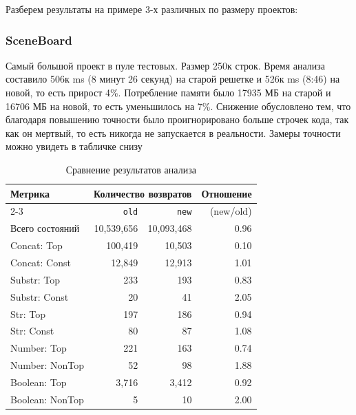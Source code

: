 Разберем результаты на примере 3-х различных по размеру проектов:

\subsubsection*{SceneBoard}
Самый большой проект в пуле тестовых. Размер 250к строк. Время анализа составило 506к ms (8 минут 26 секунд) на старой решетке и 526к ms (8:46) на новой, то есть прирост 4\%. Потребление памяти было 17935 МБ на старой и 16706 МБ на новой, то есть уменьшилось на 7\%. Снижение обусловлено тем, что благодаря повышению точности было проигнорировано больше строчек кода, так как он мертвый, то есть никогда не запускается в реальности. Замеры точности можно увидеть в табличке снизу

\begin{table}[h]
\centering
\caption{Сравнение результатов анализа}
\begin{tabular}{lrrr}
\toprule
\multirow{2}{*}{Метрика} & \multicolumn{2}{c}{Количество возвратов} & \multirow{2}{*}{Отношение} \\
\cmidrule(lr){2-3}
 & \texttt{old} & \texttt{new} & (new/old) \\
\midrule
Всего состояний & 10,539,656 & 10,093,468 & 0.96 \\
\addlinespace
Concat: Top & 100,419 & 10,503 & 0.10 \\
Concat: Const & 12,849 & 12,913 & 1.01 \\
\addlinespace
Substr: Top & 233 & 193 & 0.83 \\
Substr: Const & 20 & 41 & 2.05 \\
\addlinespace
Str: Top & 197 & 186 & 0.94 \\
Str: Const & 80 & 87 & 1.08 \\
\addlinespace
Number: Top & 221 & 163 & 0.74 \\
Number: NonTop & 52 & 98 & 1.88 \\
\addlinespace
Boolean: Top & 3,716 & 3,412 & 0.92 \\
Boolean: NonTop & 5 & 10 & 2.00 \\
\bottomrule
\end{tabular}
\end{table}



